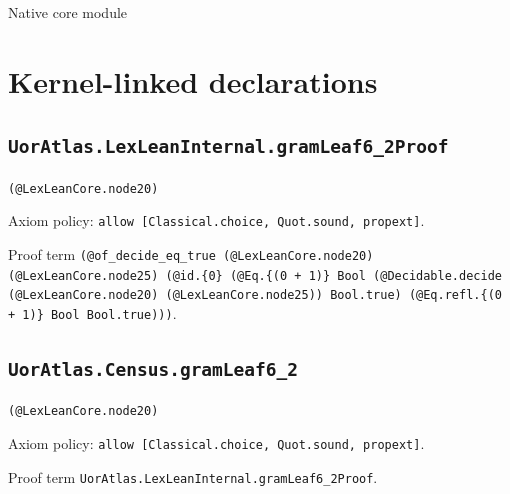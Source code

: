 \documentclass[11pt]{article}
\begin{document}
\begin{center}{\LARGE Native core module}\end{center}
\section*{Kernel-linked declarations}
\subsection*{\texttt{UorAtlas.LexLeanInternal.gramLeaf6\_2Proof}}
\noindent\texttt{(@LexLeanCore.node20)}\par
\noindent Axiom policy: \texttt{allow [Classical.choice, Quot.sound, propext]}.\par
\noindent Proof term \texttt{(@of\_decide\_eq\_true (@LexLeanCore.node20) (@LexLeanCore.node25) (@id.\{0\} (@Eq.\{(0 + 1)\} Bool (@Decidable.decide (@LexLeanCore.node20) (@LexLeanCore.node25)) Bool.true) (@Eq.refl.\{(0 + 1)\} Bool Bool.true)))}.\par
\subsection*{\texttt{UorAtlas.Census.gramLeaf6\_2}}
\noindent\texttt{(@LexLeanCore.node20)}\par
\noindent Axiom policy: \texttt{allow [Classical.choice, Quot.sound, propext]}.\par
\noindent Proof term \texttt{UorAtlas.LexLeanInternal.gramLeaf6\_2Proof}.\par
\end{document}

